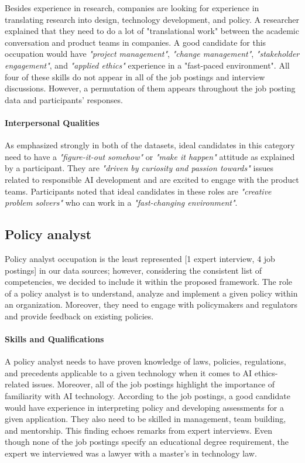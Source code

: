 \documentclass[sigconf]{acmart}
\begin{document}
Besides experience in research, companies are looking for experience in translating research into design, technology development, and policy. A researcher explained that they need to do a lot of "translational work" between the academic conversation and product teams in companies. A good candidate for this occupation would have \textit{"project management"}, \textit{"change management"}, \textit{"stakeholder engagement"}, and \textit{"applied ethics"} experience in a "fast-paced environment". All four of these skills do not appear in all of the job postings and interview discussions. However, a permutation of them appears throughout the job posting data and participants' responses. %

\paragraph{Interpersonal Qualities}

As emphasized strongly in both of the datasets, ideal candidates in this category need to have a \textit{"figure-it-out somehow"} or \textit{"make it happen"} attitude as explained by a participant. They are \textit{"driven by curiosity and passion towards"} issues related to responsible AI development and are excited to engage with the product teams. Participants noted that ideal candidates in these roles are \textit{"creative problem solvers"} who can work in a \textit{"fast-changing environment"}. 


\subsection{Policy analyst}
Policy analyst occupation is the least represented [1 expert interview, 4 job postings] in our data sources; however, considering the consistent list of competencies, we decided to include it within the proposed framework. The role of a policy analyst is to understand, analyze and implement a given policy within an organization. Moreover, they need to engage with policymakers and regulators and provide feedback on existing policies. 

\paragraph{Skills and Qualifications} 
A policy analyst needs to have proven knowledge of laws, policies, regulations, and precedents applicable to a given technology when it comes to \ac{AI} ethics-related issues. Moreover, all of the job postings highlight the importance of familiarity with \ac{AI} technology. According to the job postings, a good candidate would have experience in interpreting policy and developing assessments for a given application. They also need to be skilled in management, team building, and mentorship. This finding echoes remarks from expert interviews. Even though none of the job postings specify an educational degree requirement, the expert we interviewed was a lawyer with a master's in technology law. 
\end{document}
